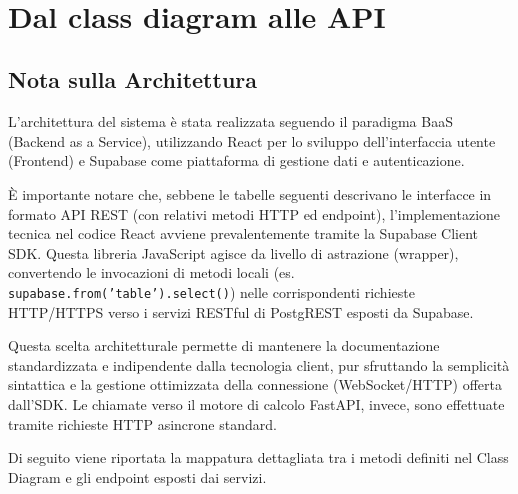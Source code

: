 \setcounter{section}{3}
\setlength{\parindent}{0pt}  %
\setlength{\parskip}{6pt}
\section{Dal class diagram alle API}
\subsection*{Nota sulla Architettura}

L'architettura del sistema è stata realizzata seguendo il paradigma BaaS (Backend as a Service), utilizzando React per lo sviluppo dell'interfaccia utente (Frontend) e Supabase come piattaforma di gestione dati e autenticazione.

È importante notare che, sebbene le tabelle seguenti descrivano le interfacce in formato API REST (con relativi metodi HTTP ed endpoint), l'implementazione tecnica nel codice React avviene prevalentemente tramite la Supabase Client SDK. Questa libreria JavaScript agisce da livello di astrazione (wrapper), convertendo le invocazioni di metodi locali (es. \texttt{supabase.from('table').select()}) nelle corrispondenti richieste HTTP/HTTPS verso i servizi RESTful di PostgREST esposti da Supabase.

Questa scelta architetturale permette di mantenere la documentazione standardizzata e indipendente dalla tecnologia client, pur sfruttando la semplicità sintattica e la gestione ottimizzata della connessione (WebSocket/HTTP) offerta dall'SDK. Le chiamate verso il motore di calcolo FastAPI, invece, sono effettuate tramite richieste HTTP asincrone standard.

Di seguito viene riportata la mappatura dettagliata tra i metodi definiti nel Class Diagram e gli endpoint esposti dai servizi.

